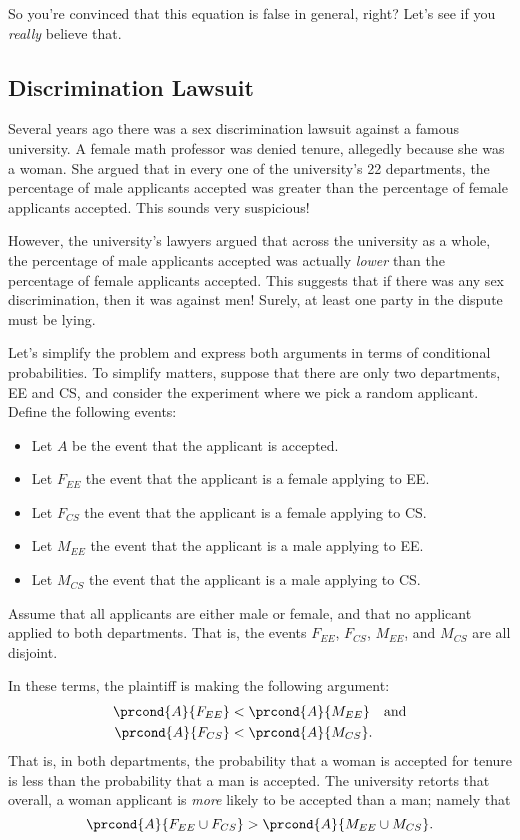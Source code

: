 So you're convinced that this equation is false in general, right?
Let's see if you \emph{really} believe that.

\subsection{Discrimination Lawsuit}\label{discrimination_subsec}

Several years ago there was a sex discrimination lawsuit against a
famous university.  A female math professor was denied tenure,
allegedly because she was a woman.  She argued that in every one of
the university's 22 departments, the percentage of male applicants
accepted was greater than the percentage of female applicants
accepted.  This sounds very suspicious!

However, the university's lawyers argued that across the university as
a whole, the percentage of male applicants accepted was actually
\emph{lower} than the percentage of female applicants accepted.  This
suggests that if there was any sex discrimination, then it was against
men!  Surely, at least one party in the dispute must be lying.

Let's simplify the problem and express both arguments in terms of
conditional probabilities.  To simplify matters, suppose that there
are only two departments, EE and CS, and consider the experiment where
we pick a random applicant.  Define the following events:
%
\begin{itemize}
\item Let $A$ be the event that the applicant is accepted.
\item Let $F_{EE}$ the event that the applicant is a female applying to EE.
\item Let $F_{CS}$ the event that the applicant is a female applying to CS.
\item Let $M_{EE}$ the event that the applicant is a male applying to EE.
\item Let $M_{CS}$ the event that the applicant is a male applying to
CS.
\end{itemize}
%
Assume that all applicants are either male or female, and that no
applicant applied to both departments.  That is, the events $F_{EE}$,
$F_{CS}$, $M_{EE}$, and $M_{CS}$ are all disjoint.

In these terms, the plaintiff is making the following argument:
%
\begin{align*}
\prcond{A}{F_{EE}} & < \prcond{A}{M_{EE}} \quad\text{and}\\
\prcond{A}{F_{CS}} & < \prcond{A}{M_{CS}}.
\end{align*}
%
That is, in both departments, the probability that a woman is accepted
for tenure is less than the probability that a man is accepted.  The
university retorts that overall, a woman applicant is \emph{more}
likely to be accepted than a man; namely that
%
\[
    \prcond{A}{F_{EE} \cup F_{CS}} > \prcond{A}{M_{EE} \cup M_{CS}}.
\]

